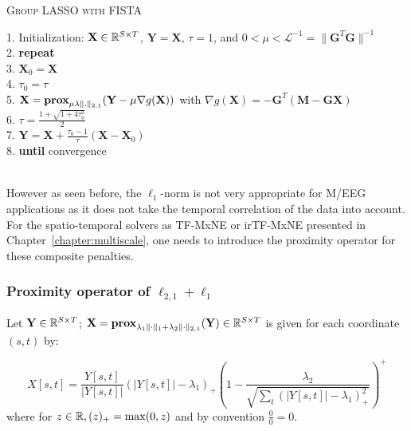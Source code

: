 {\fontsize{4}{4}\selectfont
\begin{algorithm}[t]
\caption{\textsc{Group LASSO with FISTA}}

1. Initialization: $\mathbf{X}\in\mathbb{R}^{S\times T}$, $\mathbf{Y}=\mathbf{X}$, $\tau=1$, and $0 < \mu < \mathcal{L}^{-1} = \|\mathbf{G}^T\mathbf{G}\|^{-1}$\\
2. \textbf{repeat}\\
3. \hspace{4pt} $\mathbf{X}_0 = \mathbf{X}$\\
4. \hspace{4pt} $\tau_0 = \tau$\\
5. \hspace{4pt} $\mathbf{X} = \textbf{prox}_{\mu\lambda\|.\|_{2,1}}(\mathbf{Y}-\mu\nabla g(\mathbf{X}))$ with $\nabla g(\mathbf{X})= -\mathbf{G}^T(\mathbf{M}-\mathbf{GX})$ \\
6. \hspace{4pt} $\tau = \frac{1+\sqrt{1+4\tau^2_0}}{2}$\\
7. \hspace{4pt} $\mathbf{Y} = \mathbf{X} + \frac{\tau_0 - 1}{\tau}(\mathbf{X}-\mathbf{X}_0)$\\
8. \textbf{until} convergence\\
\\
\label{alg:FISTA}
\end{algorithm}
}

However as seen before, the $\ell_1$-norm is not very appropriate for M/EEG applications as it does not take the temporal correlation of the data into account. For the spatio-temporal solvers as TF-MxNE or irTF-MxNE presented in Chapter~\ref{chapter:multiscale}, one needs to introduce the proximity operator for these composite penalties.

\adjustwidth{1em}{0pt}
\subsubsection*{Proximity operator of $\ell_{2,1}+\ell_1$}
Let $\mathbf{Y}\in\mathbb{R}^{S\times T}$; $\mathbf{X}=\textbf{prox}_{\lambda_1\|\cdot\|_1+\lambda_2\|\cdot\|_{2,1}}(\mathbf{Y})\in\mathbb{R}^{S\times T}$ is given for each coordinate $(s,t)$ by:

\begin{equation} \label{prox_mixed}
	X[s,t]=\frac{Y[s,t]}{|Y[s,t]|}(|Y[s,t]|-\lambda_1)_+\left(1-\frac{\lambda_2}{\sqrt{\sum_t(|Y[s,t]|-\lambda_1)_+^{2}}}\right)^+
\end{equation}
where for $z\in\mathbb{R}, (z)_+ =\max(0,z)$ and by convention $\frac{0}{0}=0$.
\endadjustwidth


